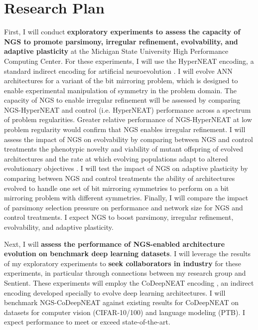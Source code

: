 \section{Research Plan}

First, I will conduct \textbf{exploratory experiments to assess the capacity of NGS to promote parsimony, irregular refinement, evolvability, and adaptive plasticity} at the Michigan State University High Performance Computing Center.
For these experiments, I will use the HyperNEAT encoding, a standard indirect encoding for artificial neuroevolution \cite{clune2011performance}.
I will evolve ANN architectures for a variant of the bit mirroring problem, which is designed to enable experimental manipulation of symmetry in the problem domain.
The capacity of NGS to enable irregular refinement will be assessed by comparing NGS-HyperNEAT and control (i.e. HyperNEAT) performance across a spectrum of problem regularities.
Greater relative performance of NGS-HyperNEAT at low problem regularity would confirm that NGS enables irregular refinement.
I will assess the impact of NGS on evolvability by comparing between NGS and control treatments the phenotypic novelty and viability of mutant offspring of evolved architectures and the rate at which evolving populations adapt to altered evolutionary objectives \cite{tarapore2015evolvability}.
I will test the impact of NGS on adaptive plasticity by comparing between NGS and control treatments the ability of architectures evolved to handle one set of bit mirroring symmetries to perform on a bit mirroring problem with different symmetries.
Finally, I will compare the impact of parsimony selection pressure on performance and network size for NGS and control treatments.
I expect NGS to boost parsimony, irregular refinement, evolvability, and adaptive plasticity.

Next, I will \textbf{assess the performance of NGS-enabled architecture evolution on benchmark deep learning datasets}.
I will leverage the results of my exploratory experiments to \textbf{seek collaborators in industry} for these experiments, in particular through connections between my research group and Sentient.
These experiments will employ the CoDeepNEAT encoding \cite{miikkulainen2017evolving}, an indirect encoding developed specially to evolve deep learning architectures.
I will benchmark NGS-CoDeepNEAT against existing results for CoDeepNEAT on datasets for computer vision (CIFAR-10/100) and language modeling (PTB).
I expect performance to meet or exceed state-of-the-art.
